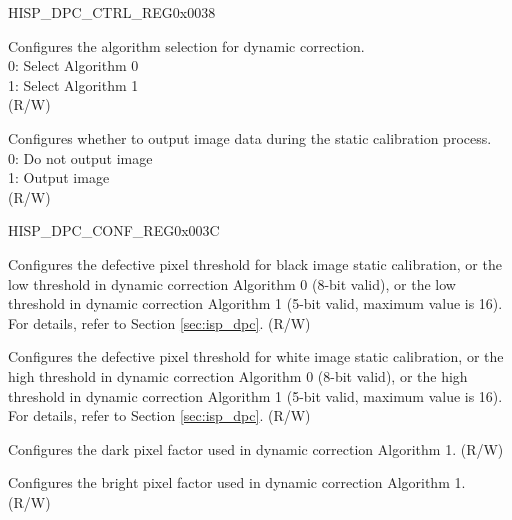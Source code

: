 \begin{register}{H}{ISP\_DPC\_CTRL\_REG}{0x0038}
\begin{regdesc}
\begin{reglist}
\label{fielddesc:ISPDPCMETHODSEL}\item [ISP\_DPC\_METHOD\_SEL] Configures the algorithm selection for dynamic correction.\\0: Select Algorithm 0\\1: Select Algorithm 1\\(R/W)
\label{fielddesc:ISPDPCCHECKODEN}\item [ISP\_DPC\_CHECK\_OD\_EN] Configures whether to output image data during the static calibration process.\\0: Do not output image\\1: Output image\\(R/W)
\end{reglist}\end{regdesc}
\end{register}


\begin{register}{H}{ISP\_DPC\_CONF\_REG}{0x003C}\label{regdesc:ISPDPCCONFREG}
%
%
%
%
%
\regnewline%
\begin{regdesc}\begin{reglist}
\label{fielddesc:ISPDPCTHRESHOLDL}\item [ISP\_DPC\_THRESHOLD\_L] Configures the defective pixel threshold for black image static calibration, or the low threshold in dynamic correction Algorithm 0 (8-bit valid), or the low threshold in dynamic correction Algorithm 1 (5-bit valid, maximum value is 16). For details, refer to Section \ref{sec:isp_dpc}. (R/W)
\label{fielddesc:ISPDPCTHRESHOLDH}\item [ISP\_DPC\_THRESHOLD\_H] Configures the defective pixel threshold for white image static calibration, or the high threshold in dynamic correction Algorithm 0 (8-bit valid), or the high threshold in dynamic correction Algorithm 1 (5-bit valid, maximum value is 16). For details, refer to Section \ref{sec:isp_dpc}. (R/W)
\label{fielddesc:ISPDPCFACTORDARK}\item [ISP\_DPC\_FACTOR\_DARK] Configures the dark pixel factor used in dynamic correction Algorithm 1. (R/W)
\label{fielddesc:ISPDPCFACTORBRIG}\item [ISP\_DPC\_FACTOR\_BRIG] Configures the bright pixel factor used in dynamic correction Algorithm 1. (R/W)
\end{reglist}\end{regdesc}
\end{register}



